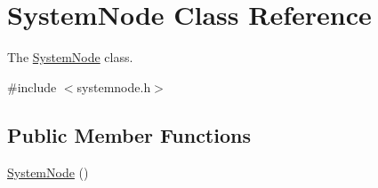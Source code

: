 \hypertarget{class_system_node}{}\section{System\+Node Class Reference}
\label{class_system_node}


The \hyperlink{class_system_node}{System\+Node} class.  




{\ttfamily \#include $<$systemnode.\+h$>$}

\subsection*{Public Member Functions}
\begin{DoxyCompactItemize}
\item 
\hyperlink{class_system_node_a070631ac4b74676036ec2c9a2b0cfe42}{System\+Node} ()\hypertarget{class_system_node_a070631ac4b74676036ec2c9a2b0cfe42}{}\label{class_system_node_a070631ac4b74676036ec2c9a2b0cfe42}


\end{DoxyCompactItemize}
